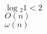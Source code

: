 \documentclass{article}
\begin{document}
                                                                                                                                                                                                                                                                                                                                                                                                                                                                                                                                                                                                                                                                                                                                                                                                                                                                                        $\log{_2}{1} < 2$\\
                                                                                                                                                                                                                                                                                                                                                                                                                                                                                                                                                                                                                                                                                                                                                                                                                                                                                                $O(n)$ \\
                                                                                                                                                                                                                                                                                                                                                                                                                                                                                                                                                                                                                                                                                                                                                                                                                                                                                                        $\omega(n)$\\
\end{document}
